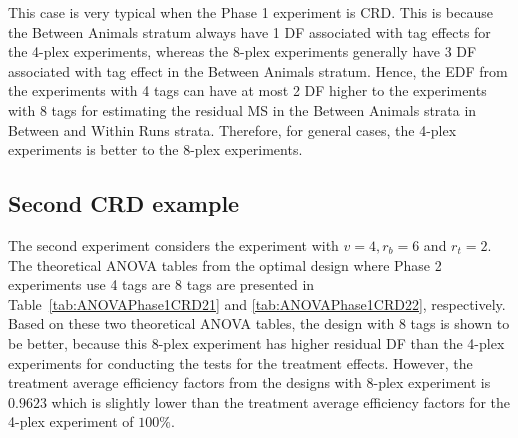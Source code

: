\documentclass[12pt,a4paper]{article}
\begin{document}
This case is very typical when the Phase 1 experiment is CRD. This is because the Between Animals stratum always have 1 DF associated with tag effects for the 4-plex experiments, whereas the 8-plex experiments generally have 3 DF associated with tag effect in the Between Animals stratum. Hence, the EDF from the experiments with 4 tags can have at most 2 DF higher to the experiments with 8 tags for estimating the residual MS in the Between Animals strata in Between and Within Runs strata. Therefore, for general cases, the 4-plex experiments is better to the 8-plex experiments.


\subsection{Second CRD example}
The second experiment considers the experiment with $v = 4, r_b = 6$ and $r_t = 2$. The theoretical ANOVA tables from the optimal design where Phase 2 experiments use 4 tags are 8 tags are presented in Table~\ref{tab:ANOVAPhase1CRD21} and \ref{tab:ANOVAPhase1CRD22}, respectively. 
Based on these two theoretical ANOVA tables, the design with 8 tags is shown to be better, because this 8-plex experiment has higher residual DF than the 4-plex experiments for conducting the tests for the treatment effects. However, the treatment average efficiency factors from the designs with 8-plex experiment is $0.9623$ which is slightly lower than the treatment average efficiency factors for the 4-plex experiment of $100\%$.  
\end{document}
